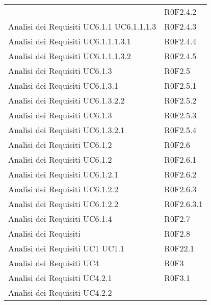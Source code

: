 \documentclass[../AnalisiDeiRequisiti.tex]{subfiles}
\begin{document}
\begin{longtable}{p{5cm}!{\VRule[1pt]}p{5cm}}
		& R0F2.4.2 \\
		Analisi dei Requisiti \newline UC6.1.1
		\newline UC6.1.1.1.3
		& R0F2.4.3 \\
		Analisi dei Requisiti \newline UC6.1.1.1.3.1
		& R0F2.4.4 \\
		Analisi dei Requisiti \newline UC6.1.1.1.3.2
		& R0F2.4.5 \\
		Analisi dei Requisiti \newline UC6.1.3
		& R0F2.5 \\
		Analisi dei Requisiti \newline UC6.1.3.1
		& R0F2.5.1 \\
		Analisi dei Requisiti \newline UC6.1.3.2.2
		& R0F2.5.2 \\
		Analisi dei Requisiti \newline UC6.1.3
		& R0F2.5.3 \\
		Analisi dei Requisiti \newline UC6.1.3.2.1
		& R0F2.5.4 \\
		Analisi dei Requisiti \newline UC6.1.2
		& R0F2.6 \\
		Analisi dei Requisiti \newline UC6.1.2
		& R0F2.6.1 \\
		Analisi dei Requisiti \newline UC6.1.2.1
		& R0F2.6.2 \\
		Analisi dei Requisiti \newline UC6.1.2.2
		& R0F2.6.3 \\
		Analisi dei Requisiti \newline UC6.1.2.2
		& R0F2.6.3.1 \\
		Analisi dei Requisiti \newline UC6.1.4
		& R0F2.7 \\
		Analisi dei Requisiti & R0F2.8 \\
		Analisi dei Requisiti \newline UC1
		\newline UC1.1
		& R0F22.1 \\
		Analisi dei Requisiti \newline UC4
		& R0F3 \\
		Analisi dei Requisiti \newline UC4.2.1
		& R0F3.1 \\
		Analisi dei Requisiti \newline UC4.2.2

\end{longtable}
\end{document}
